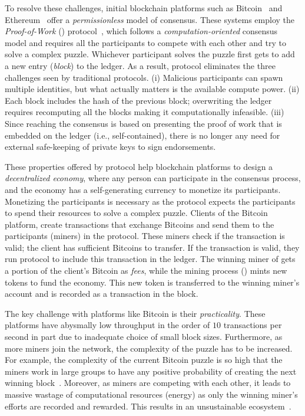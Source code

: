 To resolve these challenges, initial blockchain platforms such as 
Bitcoin~\cite{bitcoin} and Ethereum~\cite{ether} offer a {\em permissionless} 
model of consensus. These systems employ the {\em Proof-of-Work} (\PoW{}) 
protocol~\cite{bitcoin,ether}, which follows a {\em computation-oriented} 
consensus model and requires all the participants to compete with each other 
and try to solve a complex puzzle. Whichever participant solves the puzzle 
first gets to add a new entry ({\em block}) to the ledger. As a result, 
\PoW{} protocol eliminates the three challenges seen by traditional \BFT{} 
protocols. (i) Malicious participants can spawn multiple identities, but what 
actually matters is the available compute power. (ii) Each block includes 
the hash of the previous block; overwriting the ledger requires recomputing 
all the blocks making it computationally infeasible. (iii) Since reaching the 
consensus is based on presenting the proof of work that is embedded on the 
ledger (i.e., self-contained), there is no longer any need for external 
safe-keeping of private keys to sign endorsements.

These properties offered by \PoW{} protocol help blockchain platforms to 
design a {\em decentralized economy}, where any person can participate in the 
consensus process, and the economy has a self-generating currency to monetize 
its participants. Monetizing the participants is necessary as the \PoW{} 
protocol expects the participants to spend their resources to solve a complex 
puzzle. Clients of the Bitcoin platform, create transactions that exchange 
Bitcoins and send them to the participants (miners) in the \PoW{} protocol. 
These miners check if the transaction is valid; the client has sufficient 
Bitcoins to transfer. If the transaction is valid, they run \PoW{} protocol to include 
this transaction in the ledger. The winning miner of \PoW{} gets a portion of 
the client's Bitcoin as {\em fees}, while the mining process (\PoW{}) mints  
new tokens to fund the economy. This new token is transferred to the winning 
miner's account and is recorded as a transaction in the block.

The key challenge with platforms like Bitcoin is their {\em practicality}. 
These platforms have abysmally low throughput in the order of $10$ transactions 
per second in part due to inadequate choice of small block sizes. Furthermore, as 
more miners join the network, the complexity of the puzzle has to be increased. 
For example, the complexity of the current Bitcoin puzzle is so high that the 
miners work in large groups to have any positive probability of creating the 
next winning block~\cite{blockchain-book}. Moreover, as miners are competing 
with each other, it leads to massive wastage of computational resources (energy) 
as only the winning miner's efforts are recorded and rewarded. This results in an unsustainable ecosystem~\cite{badcoin,badbadcoin}.

